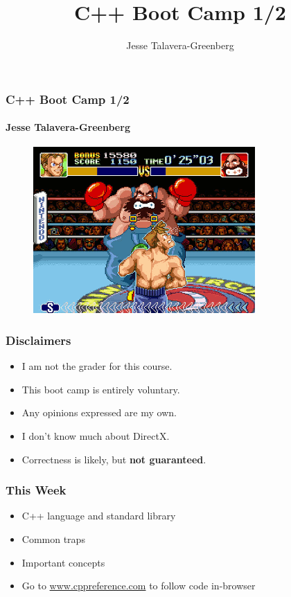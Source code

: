 \documentclass[glossy]{beamer}
\title{C++ Boot Camp 1/2}
\author{Jesse Talavera-Greenberg}
\date{}
\begin{document}
\begin{frame}[fragile=singleslide]
  \frametitle{C++ Boot Camp 1/2}
  \framesubtitle{Jesse Talavera-Greenberg}
  \begin{figure}
    \includegraphics[width=.75\columnwidth]{super-punch-out}
    \centering
  \end{figure}
\end{frame}

\begin{frame}[fragile=singleslide]
  \frametitle{Disclaimers}
  \begin{itemize}
    \item I am not the grader for this course.
    \item This boot camp is entirely voluntary.
    \item Any opinions expressed are my own.
    \item I don't know much about DirectX.
    \item Correctness is likely, but \textbf{not guaranteed}.
  \end{itemize}
\end{frame}

\begin{frame}[fragile=singleslide]
  \frametitle{This Week}
  \begin{itemize}
    \item C++ language and standard library
    \item Common traps
    \item Important concepts
    \item Go to \href{www.cppreference.com}{www.cppreference.com} to follow code in-browser
  \end{itemize}
\end{frame}
\end{document}
